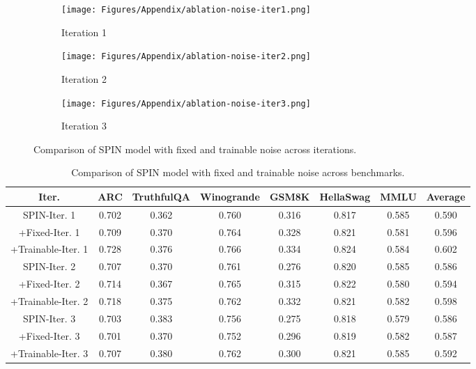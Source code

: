 \begin{appendices}
\begin{figure}[h]
    \centering

    \begin{subfigure}[b]{0.3\textwidth}
        \centering
        \texttt{[image: Figures/Appendix/ablation-noise-iter1.png]}
        \caption{Iteration 1}
    \end{subfigure}
    \hfill
    \begin{subfigure}[b]{0.3\textwidth}
        \centering
        \texttt{[image: Figures/Appendix/ablation-noise-iter2.png]}
        \caption{Iteration 2}
    \end{subfigure}
    \hfill
    \begin{subfigure}[b]{0.3\textwidth}
        \centering
        \texttt{[image: Figures/Appendix/ablation-noise-iter3.png]}
        \caption{Iteration 3}
    \end{subfigure}

    \caption{Comparison of SPIN model with fixed and trainable noise across iterations.}
    \label{fig12}
\end{figure}


\begin{table}[h]
\centering
\small
\renewcommand{\arraystretch}{0.7}
\caption{Comparison of SPIN model with fixed and trainable noise across benchmarks.}
\begin{tabular}{cccccccc}
    \toprule
    \textbf{Iter.} & \textbf{ARC} & \textbf{TruthfulQA} & \textbf{Winogrande} & \textbf{GSM8K} & \textbf{HellaSwag} & \textbf{MMLU} & \textbf{Average} \\
    \midrule
    SPIN-Iter. 1   & 0.702 & 0.362 & 0.760 & 0.316 & 0.817 & 0.585 & 0.590 \\
    +Fixed-Iter. 1 & 0.709 & 0.370 & 0.764 & 0.328 & 0.821 & 0.581 & 0.596 \\
    +Trainable-Iter. 1 & 0.728 & 0.376 & 0.766 & 0.334 & 0.824 & 0.584 & 0.602 \\
    \midrule
    SPIN-Iter. 2 & 0.707 & 0.370 & 0.761 & 0.276 & 0.820 & 0.585 & 0.586 \\
    +Fixed-Iter. 2 & 0.714 & 0.367 & 0.765 & 0.315 & 0.822 & 0.580 & 0.594 \\
    +Trainable-Iter. 2 & 0.718 & 0.375 & 0.762 & 0.332 & 0.821 & 0.582 & 0.598 \\
    \midrule
    SPIN-Iter. 3 & 0.703 & 0.383 & 0.756 & 0.275 & 0.818 & 0.579 & 0.586 \\
    +Fixed-Iter. 3 & 0.701 & 0.370 & 0.752 & 0.296 & 0.819 & 0.582 & 0.587 \\
    +Trainable-Iter. 3 & 0.707 & 0.380 & 0.762 & 0.300 & 0.821 & 0.585 & 0.592 \\
    \bottomrule
\end{tabular}
\label{table7}
\end{table}





\end{appendices}